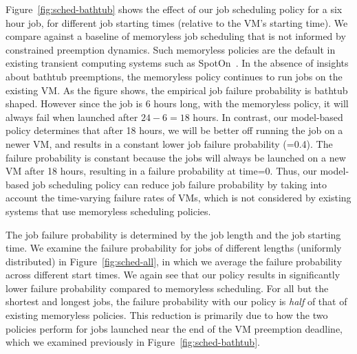 Figure~\ref{fig:sched-bathtub} shows the effect of our job scheduling policy for a six hour job, for different job starting times (relative to the VM's starting time). 
We compare against a baseline of memoryless job scheduling that is not informed by constrained preemption dynamics.
Such memoryless policies are the default in existing transient computing systems such as SpotOn~\cite{spoton}. 
In the absence of insights about bathtub preemptions, the memoryless policy continues to run jobs on the existing VM. 
As the figure shows, the empirical job failure probability is bathtub shaped. 
However since the job is 6 hours long, with the memoryless policy, it will always fail when launched after $24-6=18$ hours.
In contrast, our model-based policy determines that after 18 hours, we will be better off running the job on a newer VM, and results in a constant lower job failure probability (=0.4). The failure probability is constant because the jobs will always be launched on a new VM after 18 hours, resulting in a failure probability at time=0. 
Thus, our model-based job scheduling policy can reduce job failure probability by taking into account the time-varying failure rates of VMs, which is not considered by existing systems that use memoryless scheduling policies. 







The job failure probability is determined by the job length and the job starting time.
We examine the failure probability for jobs of different lengths (uniformly distributed) in Figure~\ref{fig:sched-all}, in which we average the failure probability across different start times.
We again see that our policy results in significantly lower failure probability compared to memoryless scheduling.
For all but the shortest and longest jobs, the failure probability with our policy is \emph{half} of that of existing memoryless policies. 
This reduction is primarily due to how the two policies perform for jobs launched near the end of the VM preemption deadline, which we examined previously in Figure~\ref{fig:sched-bathtub}. 

